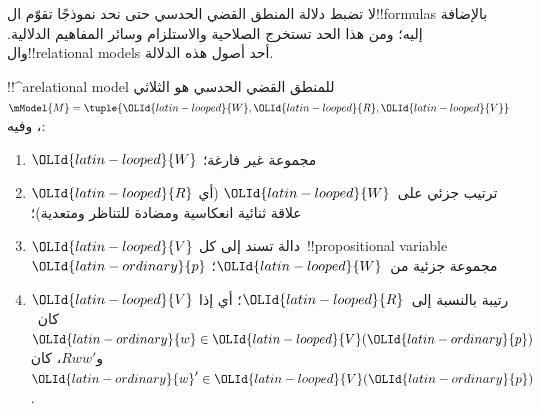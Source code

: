 \documentclass[../../../include/open-logic-section]{subfiles}
\begin{document}


لا تضبط دلالة المنطق القضي الحدسي حتى نحد نموذجًا تقوّم ال!!{formula}s
بالإضافة إليه؛ ومن هذا الحد تستخرج الصلاحية والاستلزام وسائر المفاهيم
الدلالية. وال!!{relational model}s أحد أصول هذه الدلالة.

\begin{defn}
  !!^a{relational model} للمنطق القضي الحدسي هو الثلاثي
  $\mModel{M}=\tuple{{\OLId{latin-looped}{W}},{\OLId{latin-looped}{R}},{\OLId{latin-looped}{V}}}$، وفيه:
  \begin{enumerate}
  \item ${\OLId{latin-looped}{W}}$ مجموعة غير فارغة؛
  \item ${\OLId{latin-looped}{R}}$ ترتيب جزئي على~${\OLId{latin-looped}{W}}$ (أي علاقة ثنائية انعكاسية ومضادة للتناظر
    ومتعدية)؛
  \item ${\OLId{latin-looped}{V}}$ دالة تسند إلى كل~!!{propositional
    variable}~${\OLId{latin-ordinary}{p}}$ مجموعة جزئية من~${\OLId{latin-looped}{W}}$؛
  \item ${\OLId{latin-looped}{V}}$ رتيبة بالنسبة إلى~${\OLId{latin-looped}{R}}$؛ أي إذا كان~${\OLId{latin-ordinary}{w}} \in {\OLId{latin-looped}{V}}({\OLId{latin-ordinary}{p}})$ و$Rww'$،
    كان~${\OLId{latin-ordinary}{w}}' \in {\OLId{latin-looped}{V}}({\OLId{latin-ordinary}{p}})$.
  \end{enumerate}
\end{defn}
\end{document}
